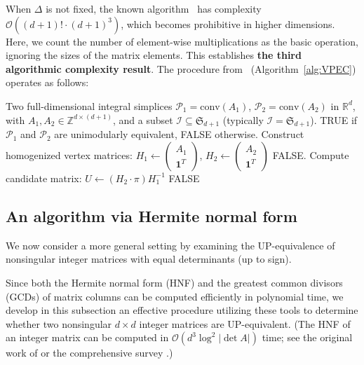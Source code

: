 \documentclass[reqno, 12pt]{article}
\theoremstyle{mydefinition}
\theoremstyle{myremark}
\numberwithin{algorithm}{section}
\begin{document}
When $\Delta$ is not fixed, the known algorithm~\cite{Abney-Mcpeek}
has complexity $\mathcal O((d+1)! \cdot (d+1)^3)$, which becomes prohibitive in higher dimensions. Here, we count the number of element-wise multiplications as the basic operation,
ignoring the sizes of the matrix elements. This establishes \textbf{the third algorithmic complexity result}. The procedure from~\cite{Abney-Mcpeek} (Algorithm~\ref{alg:VPEC}) operates as follows:

\begin{algorithm}[h]
\caption{\texttt{VPEC}: Vertex Permutation Equivalence Check for Integral Simplices}\label{alg:VPEC}
\begin{algorithmic}[1]
\Require Two full-dimensional integral simplices $\mathcal{P}_1 = \mathrm{conv}(A_1)$, $\mathcal{P}_2 = \mathrm{conv}(A_2)$ in $\mathbb{R}^d$, with $A_1, A_2 \in \mathbb{Z}^{d \times (d+1)}$,
and a subset  $\mathcal{I} \subseteq \mathfrak{S}_{d+1}$ (typically $\mathcal{I} = \mathfrak{S}_{d+1}$).
\Ensure TRUE if $\mathcal{P}_1$ and $\mathcal{P}_2$ are unimodularly equivalent, FALSE otherwise.
\State Construct homogenized vertex matrices:
$H_1 \gets \begin{pmatrix} A_1 \\ \mathbf{1}^T \end{pmatrix}$, $H_2 \gets \begin{pmatrix} A_2 \\ \mathbf{1}^T \end{pmatrix}$
\State \Return FALSE.
\EndIf
{}
    \State Compute candidate matrix: $U \gets ( H_2\cdot\pi) H_1^{-1}$
        \State \Return [TRUE, $\pi$]
    \EndIf
\EndFor
\State \Return FALSE
\end{algorithmic}
\end{algorithm}






\subsection{An algorithm via Hermite normal form}
We now consider a more general setting by examining the UP-equivalence of nonsingular integer matrices with equal determinants (up to sign).

Since both the Hermite normal form (HNF) and the greatest common divisors (GCDs) of matrix columns can be computed efficiently in polynomial time, we develop in this subsection an effective procedure utilizing these tools to determine whether two nonsingular \(d \times d\) integer matrices are UP-equivalent. (The HNF of an integer matrix can be computed in \(\mathcal O(d^3\log^2 |\det A|)\) time; see the original work of \cite{Domich-Kannan-Trotter} or the comprehensive survey \cite{HNF_survey}.)
\end{document}
